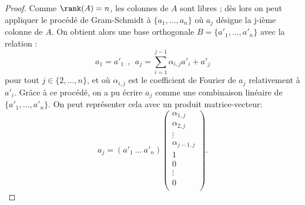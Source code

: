 \begin{proof}
Comme $\rank(A) = n$, les colonnes de $A$ sont libres ; dès lors on peut appliquer le procédé de Gram-Schmidt à $\{a_1, \dots , a_n \} $ où $a_j$ désigne la j-ième colonne de $A$. On obtient alors une base orthogonale $B=  \{a'_1, \dots , a'_n\}$ avec la relation :
\begin{displaymath}
a_1=a'_1
~~,~~
a_j = \sum_{i=1}^{j-1} \alpha_{i,j} a'_i +a'_j
\end{displaymath}
pour tout $j \in \{2, \dots,n\}$, et où $\alpha_{i,j} $ est le coefficient de Fourier de $a_j$ relativement à $a'_i$.
Grâce à ce procédé, on a pu écrire $a_j$ comme une combinaison linéaire de $\{a'_1, \dots , a'_n\} $. On peut représenter cela avec un produit matrice-vecteur:
\begin{displaymath}
a_j= (a'_1 ~ \dots ~ a'_n)
\begin{pmatrix}
\alpha_{1,j}\\\alpha_{2,j}\\\vdots\\\alpha_{j-1,j}\\1\\0\\\vdots\\0\\
\end{pmatrix}.  
\end{displaymath}


\end{proof}
